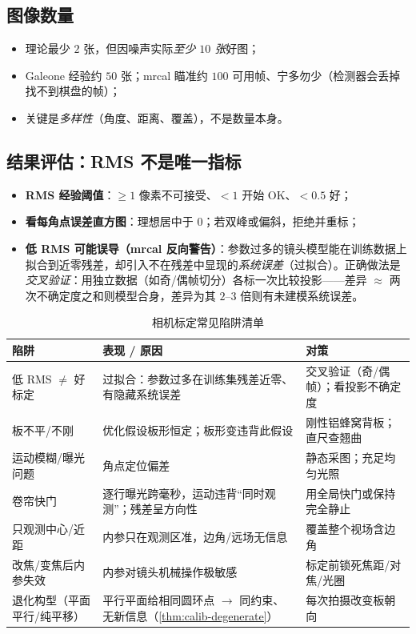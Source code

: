\subsection{图像数量}
\begin{itemize}
  \item 理论最少 $2$ 张，但因噪声实际\emph{至少 $10$ 张}好图\cite{opencv2013calib}；
  \item Galeone 经验约 $50$ 张\cite{galeone2018guidelines}；mrcal 瞄准约 $100$ 可用帧、宁多勿少（检测器会丢掉找不到棋盘的帧）\cite{kogan2024mrcal}；
  \item 关键是\emph{多样性}（角度、距离、覆盖），不是数量本身。
\end{itemize}

\subsection{结果评估：RMS 不是唯一指标}
\begin{itemize}
  \item \textbf{RMS 经验阈值}\cite{galeone2018guidelines}：$\ge1$ 像素不可接受、$<1$ 开始 OK、$<0.5$ 好；
  \item \textbf{看每角点误差直方图}：理想居中于 $0$；若双峰或偏斜，拒绝并重标；
  \item \textbf{低 RMS 可能误导（mrcal 反向警告）}\cite{kogan2024mrcal}：参数过多的镜头模型能在训练数据上拟合到近零残差，却引入不在残差中显现的\emph{系统误差}（过拟合）。正确做法是\emph{交叉验证}：用独立数据（如奇/偶帧切分）各标一次比较投影——差异 $\approx$ 两次不确定度之和则模型合身，差异为其 $2$--$3$ 倍则有未建模系统误差。
\end{itemize}

\begin{table}[ht]\centering\small
\caption{相机标定常见陷阱清单\cite{kogan2024mrcal,galeone2018guidelines}}
\label{tab:calib-pitfalls}
\begin{tabular}{p{} p{} p{}}
\toprule
陷阱 & 表现 / 原因 & 对策 \\
\midrule
低 RMS $\ne$ 好标定 & 过拟合：参数过多在训练集残差近零、有隐藏系统误差 & 交叉验证（奇/偶帧）；看投影不确定度 \\
板不平/不刚 & 优化假设板形恒定；板形变违背此假设 & 刚性铝蜂窝背板；直尺查翘曲 \\
运动模糊/曝光问题 & 角点定位偏差 & 静态采图；充足均匀光照 \\
卷帘快门 & 逐行曝光跨毫秒，运动违背“同时观测”；残差呈方向性 & 用全局快门或保持完全静止 \\
只观测中心/近距 & 内参只在观测区准，边角/远场无信息 & 覆盖整个视场含边角 \\
改焦/变焦后内参失效 & 内参对镜头机械操作极敏感 & 标定前锁死焦距/对焦/光圈 \\
退化构型（平面平行/纯平移）& 平行平面给相同圆环点 $\to$ 同约束、无新信息（\cref{thm:calib-degenerate}）& 每次拍摄改变板朝向 \\
\bottomrule
\end{tabular}
\end{table}


